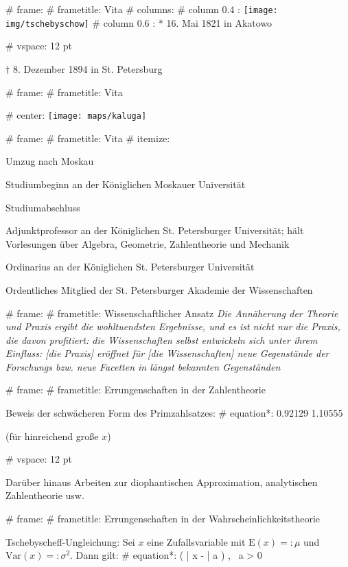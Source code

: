 # frame:
  # frametitle: Vita
  # columns:
    # column {0.4 \textwidth}:
      \texttt{[image: img/tschebyschow]}
    # column {0.6 \textwidth}:
      $*$ 16. Mai 1821 in Akatowo

      # vspace: 12 pt

      $\dagger$ 8. Dezember 1894 in St. Petersburg

# frame:
  # frametitle: Vita

  # center:
    \texttt{[image: maps/kaluga]}

# frame:
  # frametitle: Vita
    # itemize:
      \item[1832 (11)] Umzug nach Moskau
      \item[1837 (16)] Studiumbeginn an der Königlichen Moskauer Universität
      \item[1841 (20)] Studiumabschluss
      \item[1847 (26)] Adjunktprofessor an der Königlichen St. Petersburger Universität;
        hält Vorlesungen über Algebra, Geometrie, Zahlentheorie und Mechanik
      \item[1850 (29)] Ordinarius an der Königlichen St. Petersburger Universität
      \item[1858 (37)] Ordentliches Mitglied der St. Petersburger Akademie der Wissenschaften

# frame:
  # frametitle: Wissenschaftlicher Ansatz
    \emph{\glqq{}Die Annäherung der Theorie und Praxis ergibt die wohltuendsten Ergebnisse,
    und es ist nicht nur die Praxis, die davon profitiert:
    die Wissenschaften selbst entwickeln sich unter ihrem Einfluss:
    [die Praxis] eröffnet für [die Wissenschaften] neue Gegenstände der Forschungs
    bzw. neue Facetten in längst bekannten Gegenständen\grqq}

# frame:
  # frametitle: Errungenschaften in der Zahlentheorie

  Beweis der schwächeren Form des Primzahlsatzes:
  # equation*:
    \num{0.92129} \leqslant {} \leqslant \num{1.10555}

  (für hinreichend große $x$)

  # vspace: 12 pt

  Darüber hinaus Arbeiten zur diophantischen Approximation,
  analytischen Zahlentheorie usw.

# frame:
  # frametitle: Errungenschaften in der Wahrscheinlichkeitstheorie

  Tschebyscheff-Ungleichung: Sei $x$ eine Zufallsvariable mit
  $\text{E}(x) =: \mu$ und $\text{Var}(x) =: \sigma^2$. Dann gilt:
  # equation*:
    \!\left( | x - \mu | \geqslant a \right) \leqslant {},
    \ a > 0


